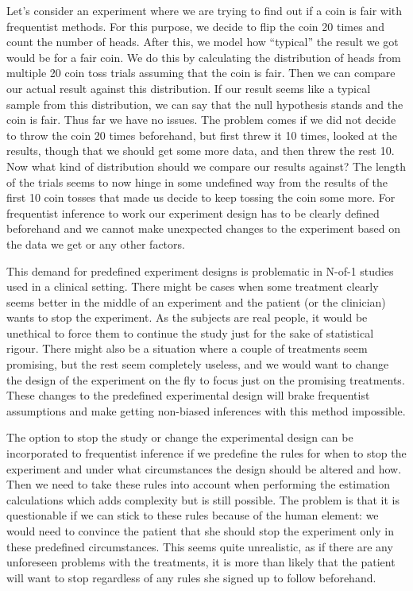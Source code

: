 \documentclass[12pt,a4paper,leqno]{report}
\theoremstyle{plain}
\theoremstyle{definition}
\theoremstyle{remark}
\begin{document}
Let's consider an experiment where we are trying to find out if a coin
is fair with frequentist methods. For this purpose, we decide to flip the coin 20 times
and count the number of heads. After this, we model how ``typical'' the result we got
would be for a fair coin. We do this by calculating the distribution of heads from
multiple 20 coin toss trials
assuming that the coin is fair. Then we can compare our actual result against this
distribution. If our result seems like a typical sample from this distribution, we
can say that the null hypothesis stands and the coin is fair. Thus far we have no
issues. The problem comes if we did not decide to throw the coin 20 times
beforehand, but first threw it 10 times, looked at the results, though that we
should get some more data, and then threw the rest 10. Now what
kind of distribution should we compare our results against? The length of the trials
seems to now hinge in some undefined way from the results of the first 10 coin tosses
that made us decide to keep tossing the coin some more. For frequentist inference to
work our experiment design has to be clearly defined beforehand and we cannot make
unexpected changes to the experiment based on the data we get or any other factors.

This demand for predefined experiment designs is problematic in N-of-1 studies
used in a clinical setting. There might be cases when some treatment clearly seems
better in the middle of an experiment and the patient (or the clinician)
wants to stop the experiment. As the subjects are real people, it would be
unethical to force them to continue the study just for the sake of statistical
rigour. There might also be a situation where a couple of treatments seem
promising, but the rest seem completely useless, and we would want to change the
design of the experiment on the fly to focus just on the promising treatments.
These changes to the predefined experimental design will brake frequentist
assumptions and make getting non-biased inferences with this method impossible.

The option to stop the study or change the experimental design can be
incorporated to frequentist inference if we predefine the rules for when to
stop the experiment and under what circumstances the design should be altered
and how. Then we need to take these rules into account when performing the estimation
calculations which adds complexity but is still possible. The problem is that it is
questionable if we can stick to these rules because of
the human element: we would need to convince the patient that she should
stop the experiment only in these predefined circumstances. This seems quite
unrealistic, as if there are any unforeseen problems with the treatments, it is
more than likely that the patient will want to stop regardless of any rules she
signed up to follow beforehand.
\end{document}
